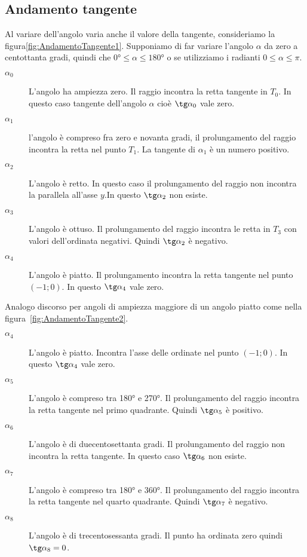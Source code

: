 \subsection{Andamento tangente}
\label{sec:AndamentoTangente}
Al variare dell'angolo varia anche il valore della tangente, consideriamo la figura\nobs\vref{fig:AndamentoTangente1}. Supponiamo di far variare l'angolo $\alpha$ da zero a centottanta gradi, quindi che $\ang{0}\leq\alpha\leq\ang{180}$ o se utilizziamo i radianti $0\leq\alpha\leq\pi$. 
\begin{description}
	\item[$\alpha_0$] L'angolo ha ampiezza zero. Il raggio incontra la retta tangente in  $T_0$. In questo caso  tangente  dell'angolo $\alpha$ cioè $\tg\alpha_0$ vale zero.
	\item [$\alpha_1$] l'angolo è compreso fra zero e novanta gradi, il prolungamento del raggio  incontra la retta nel punto $T_1$. La tangente di $\alpha_1$ è un numero positivo.
	\item [$\alpha_2$] L'angolo  è retto. In questo caso il prolungamento del raggio non incontra la parallela all'asse $y$.In questo    $\tg\alpha_2$ non esiste. 
	\item [$\alpha_3$]  L'angolo è ottuso. Il prolungamento del raggio incontra le retta in $T_3$  con valori dell'ordinata negativi. Quindi $\tg\alpha_2$ è negativo.
	\item [$\alpha_4$] L'angolo  è  piatto. Il  prolungamento incontra la retta tangente  nel punto $(-1;0)$. In questo  $\tg\alpha_4$ vale zero.
\end{description}
Analogo discorso per angoli di ampiezza  maggiore di un angolo  piatto come nella figura~\vref{fig:AndamentoTangente2}.
\begin{description}
	\item [$\alpha_4$] L'angolo è piatto. Incontra l'asse delle ordinate nel punto $(-1;0)$. In questo  $\tg\alpha_4$ vale zero.
	\item [$\alpha_5$] L'angolo è compreso tra \ang{180} e \ang{270}. Il prolungamento del raggio incontra la retta tangente  nel primo quadrante. Quindi $\tg\alpha_5$ è positivo.
	\item [$\alpha_6$] L'angolo è di duecentosettanta gradi. Il prolungamento del raggio non incontra la retta  tangente. In questo caso  $\tg\alpha_6$ non esiste. 
	\item [$\alpha_7$] L'angolo è compreso tra \ang{180} e \ang{360}. Il prolungamento del raggio incontra la retta tangente nel quarto quadrante. Quindi $\tg\alpha_7$ è negativo.
	\item [$\alpha_8$] L'angolo è di trecentosessanta gradi. Il punto ha ordinata zero quindi  $\tg\alpha_8=0$.
\end{description}
